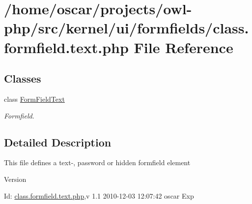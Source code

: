 \section{/home/oscar/projects/owl-\/php/src/kernel/ui/formfields/class.formfield.text.php File Reference}
\label{class_8formfield_8text_8php}
\subsection*{Classes}
\begin{DoxyCompactItemize}
\item 
class \hyperlink{classFormFieldText}{FormFieldText}
\begin{DoxyCompactList}\small\item\em Formfield. \item\end{DoxyCompactList}\end{DoxyCompactItemize}


\subsection{Detailed Description}
This file defines a text-\/, password or hidden formfield element \begin{DoxyVersion}{Version}

\end{DoxyVersion}
\begin{DoxyParagraph}{Id:}
\hyperlink{class_8formfield_8text_8php}{class.formfield.text.php},v 1.1 2010-\/12-\/03 12:07:42 oscar Exp 
\end{DoxyParagraph}
